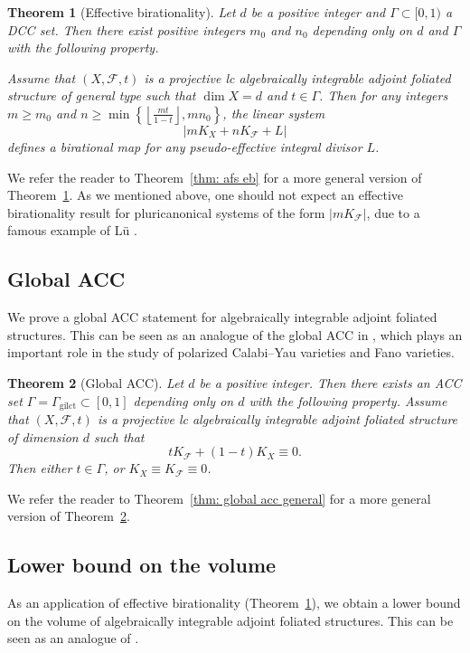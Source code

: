 \documentclass[11pt,reqno]{amsart}
\numberwithin{equation}{section}
\newcommand{\gilct}{\operatorname{gilct}}
\newcommand{\Ff}{\mathcal{F}}
\newcommand{\Ii}{\Gamma}
\newtheorem{thm}{Theorem}[section]
\theoremstyle{definition}
\begin{document}
\begin{thm}[Effective birationality]\label{thm: afs main}
Let $d$ be a positive integer and $\Ii\subset [0,1)$ a DCC set. Then there exist positive integers $m_0$ and $n_0$ depending only on $d$ and $\Ii$ with the following property. 

Assume that $(X,\Ff,t)$ is a projective lc algebraically integrable adjoint foliated structure of general type such that $\dim X=d$ and $t\in\Ii$. Then for any integers $m\geq m_0$ and $n\geq\min\left\{\left\lfloor\frac{mt}{1-t}\right\rfloor,mn_0\right\}$, the linear system
    $$|mK_X+nK_{\Ff}+L|$$
    defines a birational map for any pseudo-effective integral divisor $L$.
\end{thm}

We refer the reader to Theorem~\ref{thm: afs eb} for a more general version of Theorem~\ref{thm: afs main}. As we mentioned above, one should not expect an effective birationality result for pluricanonical systems of the form $|mK_{\Ff}|$, due to a famous example of Lü \cite[Theorem~1.3]{Lü25}.

\subsection*{Global ACC} We prove a global ACC statement for algebraically integrable adjoint foliated structures. This can be seen as an analogue of the global ACC in \cite[Theorem~1.5]{HMX14}, which plays an important role in the study of polarized Calabi--Yau varieties and Fano varieties.

\begin{thm}[Global ACC]\label{thm: global ACC main}
    Let $d$ be a positive integer. Then there exists an ACC set $\Ii=\Ii_{\gilct}\subset [0,1]$ depending only on $d$ with the following property. Assume that $(X,\Ff,t)$ is a projective lc algebraically integrable adjoint foliated structure of dimension $d$ such that
    $$tK_{\Ff}+(1-t)K_X\equiv 0.$$
    Then either $t\in\Ii$, or $K_X\equiv K_{\Ff}\equiv 0$.
\end{thm}

We refer the reader to Theorem~\ref{thm: global acc general} for a more general version of Theorem~\ref{thm: global ACC main}.

\subsection*{Lower bound on the volume} As an application of effective birationality (Theorem~\ref{thm: afs main}), we obtain a lower bound on the volume of algebraically integrable adjoint foliated structures. This can be seen as an analogue of \cite[Theorem~1.3(2)]{HMX14}.
\end{document}
